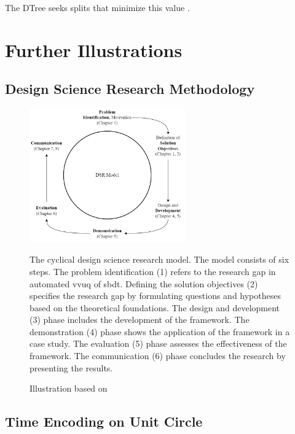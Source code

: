 \begin{appendices}
  The DTree seeks splits that minimize this value \autocite{breiman1984classification}.

  \chapter{Further Illustrations}

  \section{Design Science Research Methodology}
  \begin{figure}[H]
    \centering
    \includegraphics[width=0.6\textwidth]{figures/dsr.png}
    \caption[Design Science Methodology]{The cyclical design science research model. The model consists of six steps. The problem identification (1) refers to the research gap in automated \gls{vvuq} of \gls{sbdt}. Defining the solution objectives (2) specifies the research gap by formulating questions and hypotheses based on the theoretical foundations. The design and development (3) phase includes the development of the framework. The demonstration (4) phase shows the application of the framework in a case study. The evaluation (5) phase assesses the effectiveness of the framework. The communication (6) phase concludes the research by presenting the results.}
    \label{fig:DSR}
    \caption*{Illustration based on \textcite{peffers2007design}}
  \end{figure}

  \section{Time Encoding on Unit Circle}

  \begin{figure}[H]
    \centering
    \begin{tikzpicture}[
        scale=3, %
        hour dot/.style={circle, fill=blue!70, inner sep=1.5pt},
        hour label/.style={font=\small}
      ]


\end{tikzpicture}
\end{figure}
\end{appendices}
